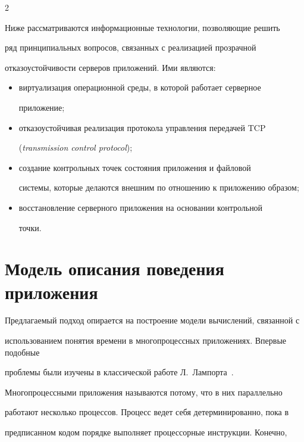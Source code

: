 \begin{multicols}{2}
{Ниже рассматриваются информационные  технологии, позволяющие решить

ряд принципиальных вопросов, связанных с реализацией прозрачной

отказоустойчивости серверов приложений. Ими являются:

\begin{itemize}

\item виртуализация операционной среды, в которой работает серверное

приложение;

\item отказоустойчивая реализация протокола управ\-ле\-ния передачей TCP

(\textit{transmission control protocol});

\item создание контрольных точек состояния приложения и файловой

системы, которые делаются внешним по отношению к приложению образом;

\item восстановление серверного приложения на осно\-ва\-нии контрольной

точки.

\end{itemize}



}



\section{Модель описания поведения приложения}



{\nwt



Предлагаемый подход опирается на построение модели вычислений, связанной с 

использованием понятия времени в многопроцессных приложениях. Впервые подобные 

проблемы были изучены в классической работе Л.~Лампорта~\cite{8zak}.



Многопроцессными приложения называются потому, что в них параллельно

работают не\-сколь\-ко процессов. Процесс ведет \mbox{себя} детерминированно, пока в

предписанном кодом порядке выполняет процессорные инст\-рук\-ции. Конечно,

}
\end{multicols}
